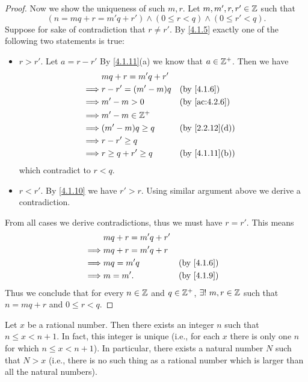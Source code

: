 \begin{proof}
  Now we show the uniqueness of such \(m, r\).
  Let \(m, m', r, r' \in \mathbb{Z}\) such that
  \[
    (n = mq + r = m'q + r') \land (0 \leq r < q) \land (0 \leq r' < q).
  \]
  Suppose for sake of contradiction that \(r \neq r'\).
  By \cref{4.1.5} exactly one of the following two statements is true:
  \begin{itemize}
    \item \(r > r'\).
          Let \(a = r - r'\)
          By \cref{4.1.11}(a) we know that \(a \in \mathbb{Z}^+\).
          Then we have
          \begin{align*}
                     & mq + r = m'q + r'                                      \\
            \implies & r - r' = (m' - m)q   &  & \by{4.1.6}                   \\
            \implies & m' - m > 0           &  & \by{ac:4.2.6}                \\
            \implies & m' - m \in \Z^+                                        \\
            \implies & (m' - m)q \geq q     &  & \text{(by \cref{2.2.12}(d))} \\
            \implies & r - r' \geq q                                          \\
            \implies & r \geq q + r' \geq q &  & \text{(by \cref{4.1.11}(b))}
          \end{align*}
          which contradict to \(r < q\).
    \item \(r < r'\).
          By \cref{4.1.10} we have \(r' > r\).
          Using similar argument above we derive a contradiction.
  \end{itemize}
  From all cases we derive contradictions, thus we must have \(r = r'\).
  This means
  \begin{align*}
             & mq + r = m'q + r'                 \\
    \implies & mq + r = m'q + r                  \\
    \implies & mq = m'q          &  & \by{4.1.6} \\
    \implies & m = m'.           &  & \by{4.1.9}
  \end{align*}
  Thus we conclude that for every \(n \in \mathbb{Z}\) and \(q \in \mathbb{Z}^+\), \(\exists!\ m, r \in \mathbb{Z}\) such that \(n = mq + r\) and \(0 \leq r < q\).
\end{proof}

\begin{prop}\label{4.4.1}
  Let \(x\) be a rational number.
  Then there exists an integer \(n\) such that \(n \leq x < n + 1\).
  In fact, this integer is unique (i.e., for each \(x\) there is only one \(n\) for which \(n \leq x < n + 1\)).
  In particular, there exists a natural number \(N\) such that \(N > x\)
  (i.e., there is no such thing as a rational number which is larger than all the natural numbers).
\end{prop}


